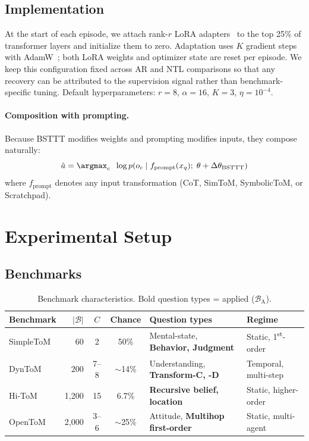 \documentclass{article}
\begin{document}
\subsection{Implementation}
\label{sec:implementation}

At the start of each episode, we attach rank-$r$ LoRA adapters~\citep{hu2022lora} to the top 25\% of transformer layers and initialize them to zero.
Adaptation uses $K$ gradient steps with AdamW~\citep{loshchilov2018decoupled}; both LoRA weights and optimizer state are reset per episode.
We keep this configuration fixed across AR and NTL comparisons so that any recovery can be attributed to the supervision signal rather than benchmark-specific tuning.
Default hyperparameters: $r{=}8$, $\alpha{=}16$, $K{=}3$, $\eta{=}10^{-4}$.

\paragraph{Composition with prompting.}
Because BSTTT modifies weights and prompting modifies inputs, they compose naturally:
\begin{equation}
    \hat{a} = \argmax_{c} \;\; \log p\!\left(o_c \;\middle|\; f_\mathrm{prompt}(x_q);\; \theta + \Delta\theta_\mathrm{BSTTT}\right)
    \label{eq:composition}
\end{equation}
where $f_\mathrm{prompt}$ denotes any input transformation (CoT, SimToM, SymbolicToM, or Scratchpad).


\section{Experimental Setup}
\label{sec:setup}

\subsection{Benchmarks}

\begin{table}[t]
    \caption{Benchmark characteristics. Bold question types = applied ($\mathcal{B}_\mathrm{A}$).}
    \label{tab:benchmarks}
    \centering
    \small
    \begin{tabular}{@{}lrccll@{}}
        \toprule
        \textbf{Benchmark} & $|\mathcal{B}|$ & $C$ & \textbf{Chance} & \textbf{Question types} & \textbf{Regime} \\
        \midrule
        SimpleToM & 60 & 2 & 50\% & Mental-state, \textbf{Behavior, Judgment} & Static, 1\textsuperscript{st}-order \\
        DynToM & 200 & 7--8 & $\sim$14\% & Understanding, \textbf{Transform-C, -D} & Temporal, multi-step \\
        Hi-ToM & 1{,}200 & 15 & 6.7\% & \textbf{Recursive belief, location} & Static, higher-order \\
        OpenToM & 2{,}000 & 3--6 & $\sim$25\% & Attitude, \textbf{Multihop first-order} & Static, multi-agent \\
        \bottomrule
    \end{tabular}
\end{table}
\end{document}
